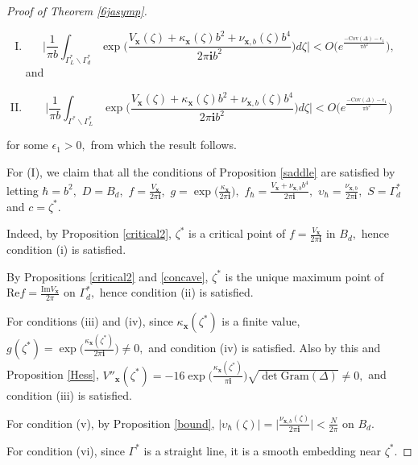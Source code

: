\documentclass[11pt]{article}
\renewcommand{\setminus}{{\smallsetminus}}
\theoremstyle{remark}
\theoremstyle{remark}
\numberwithin{equation}{section}
\begin{document}
\begin{proof}[Proof of Theorem \ref{6jasymp}]
\begin{enumerate}[(I)]
\item $$\bigg|\frac{1}{\pi b}\int_{\Gamma^*_L\setminus \Gamma^*_d}\exp\bigg(\frac{V_{\boldsymbol  x}(\zeta)+ \kappa_{\boldsymbol  x}(\zeta)b^2+ \nu_{\boldsymbol  x,b}(\zeta)b^4}{2\pi \mathbf i b^2} \bigg)d\zeta\bigg|< O\Big(e^{\frac{-\mathrm{Cov}(\Delta)-\epsilon_1}{\pi b^2}}\Big),$$
and 

\item $$\bigg|\frac{1}{\pi b}\int_{\Gamma^*\setminus \Gamma^*_L}\exp\bigg(\frac{V_{\boldsymbol  x}(\zeta)+ \kappa_{\boldsymbol  x}(\zeta)b^2+ \nu_{\boldsymbol  x,b}(\zeta)b^4}{2\pi \mathbf i b^2} \bigg)d\zeta\bigg|<O\Big(e^{\frac{-\mathrm{Cov}(\Delta)-\epsilon_1}{\pi b^2}}\Big)$$
\end{enumerate}
for some $\epsilon_1>0,$ from which the result follows.
\medskip






For (I), we claim that  all the conditions of Proposition \ref{saddle} are satisfied by letting $\hbar=b^2,$ $D=B_d,$ $f=\frac{V_{\boldsymbol  x}}{2\pi \mathbf i},$ $g=\exp\big(\frac{\kappa_{\boldsymbol  x}}{2\pi \mathbf i }\big),$ $f_\hbar=\frac{V_{\boldsymbol  x}+\nu_{\boldsymbol  x,b}b^4}{2\pi \mathbf i},$ $\upsilon_\hbar=\frac{\nu_{\boldsymbol  x,b}}{2\pi \mathbf i},$ $S=\Gamma^*_d$ and $c=\zeta^*.$ 

Indeed, by Proposition \ref{critical2}, $\zeta^*$ is a critical point of $f=\frac{V_{\boldsymbol  x}}{2\pi \mathbf i}$ in $B_{d},$ hence condition (i) is satisfied. 

By Propositions \ref{critical2} and \ref{concave}, $\zeta^*$ is the unique maximum point of $\mathrm{Re}f=\frac{\mathrm{Im}V_{\boldsymbol x}}{2\pi}$ on $\Gamma^*_d,$ hence condition (ii) is satisfied. 


For conditions (iii) and (iv), since $\kappa_{\boldsymbol  x}(\zeta^*)$ is a finite value,  $g(\zeta^*)=\exp\big(\frac{\kappa_{\boldsymbol  x}(\zeta^*)}{2\pi \mathbf i }\big)\neq 0,$ and condition (iv) is satisfied. Also by this and Proposition \ref{Hess}, $V''_{\boldsymbol  x}(\zeta^*)=-16{\exp\big(\frac{\kappa_{\boldsymbol  x}(\zeta^*)}{\pi \mathbf i}\big)}\sqrt{\det\mathrm{Gram}(\Delta)}\neq 0,$ and condition (iii) is satisfied. 


For condition (v), by Proposition \ref{bound},  $|\upsilon_{\hbar}(\zeta)|=\big|\frac{\nu_{\boldsymbol  x,b}(\zeta)}{2\pi \mathbf i}\big|<\frac{N}{2\pi}$ on $B_{d}.$ 

For condition (vi), since $\Gamma^*$ is a straight line, it is a smooth embedding near $\zeta^*.$  



\end{proof}
\end{document}
